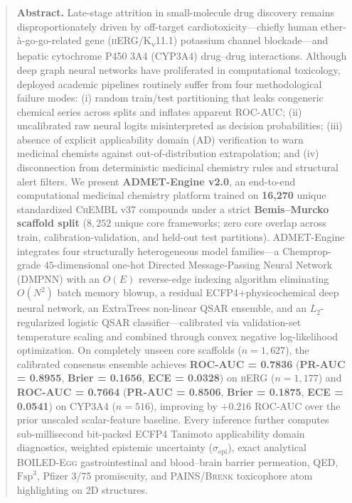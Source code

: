\documentclass[10pt,twocolumn,letterpaper]{article}
\newcommand{\sige}{\sigma_{\mathrm{epi}}}
\begin{document}
\begin{@twocolumnfalse}
  \begin{quote}
    \small\noindent\textbf{\color{InkSlate}Abstract.}
    Late-stage attrition in small-molecule drug discovery remains disproportionately driven by off-target cardiotoxicity—chiefly human ether-\`{a}-go-go-related gene (\textsc{hERG}/K\textsubscript{v}11.1) potassium channel blockade—and hepatic cytochrome P450 3A4 (\textsc{CYP3A4}) drug–drug interactions. Although deep graph neural networks have proliferated in computational toxicology, deployed academic pipelines routinely suffer from four methodological failure modes: (i) random train/test partitioning that leaks congeneric chemical series across splits and inflates apparent \textsc{ROC-AUC}; (ii) uncalibrated raw neural logits misinterpreted as decision probabilities; (iii) absence of explicit applicability domain (\textsc{AD}) verification to warn medicinal chemists against out-of-distribution extrapolation; and (iv) disconnection from deterministic medicinal chemistry rules and structural alert filters. We present \textbf{ADMET-Engine v2.0}, an end-to-end computational medicinal chemistry platform trained on \textbf{16,270} unique standardized \textsc{ChEMBL} v37 compounds under a strict \textbf{Bemis–Murcko scaffold split} ($8{,}252$ unique core frameworks; zero core overlap across train, calibration-validation, and held-out test partitions). ADMET-Engine integrates four structurally heterogeneous model families—a Chemprop-grade $45$-dimensional one-hot Directed Message-Passing Neural Network (\textsc{DMPNN}) with an $O(E)$ reverse-edge indexing algorithm eliminating $O(N^2)$ batch memory blowup, a residual \textsc{ECFP4}+physicochemical deep neural network, an ExtraTrees non-linear \textsc{QSAR} ensemble, and an $L_2$-regularized logistic \textsc{QSAR} classifier—calibrated via validation-set temperature scaling and combined through convex negative log-likelihood optimization. On completely unseen core scaffolds ($n = 1{,}627$), the calibrated consensus ensemble achieves \textbf{ROC-AUC = 0.7836} (\textbf{PR-AUC = 0.8955}, \textbf{Brier = 0.1656}, \textbf{ECE = 0.0328}) on \textsc{hERG} ($n=1{,}177$) and \textbf{ROC-AUC = 0.7664} (\textbf{PR-AUC = 0.8506}, \textbf{Brier = 0.1875}, \textbf{ECE = 0.0541}) on \textsc{CYP3A4} ($n=516$), improving by $+0.216$ \textsc{ROC-AUC} over the prior unscaled scalar-feature baseline. Every inference further computes sub-millisecond bit-packed \textsc{ECFP4} Tanimoto applicability domain diagnostics, weighted epistemic uncertainty ($\sige$), exact analytical \textsc{BOILED-Egg} gastrointestinal and blood–brain barrier permeation, \textsc{QED}, $\mathrm{Fsp}^3$, Pfizer 3/75 promiscuity, and \textsc{PAINS}/\textsc{Brenk} toxicophore atom highlighting on 2D structures.
  \end{quote}


\end{@twocolumnfalse}
\end{document}
